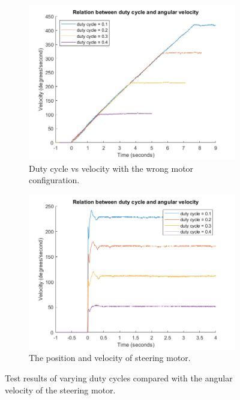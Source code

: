 \begin{figure}[H]
    \begin{subfigure}{.5\textwidth}
        \centering
        \includegraphics[width=\textwidth]{figure/pwmVsVelocity.png}
        \caption{Duty cycle vs velocity with the wrong motor configuration.}
        \label{fig:pwmVelocityTest}
    \end{subfigure}
    \begin{subfigure}{.5\textwidth}
        \centering
        \includegraphics[width=\textwidth]{figure/pwmVsVelocityFixed.png}
        \caption{The position and velocity of steering motor.}
        \label{fig:pwmVelocityTestFixed}
    \end{subfigure}
\caption{Test results of varying duty cycles compared with the angular velocity of the steering motor.}
\end{figure}

